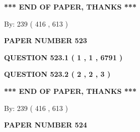 \documentclass[12pt]{article}
\begin{document}
  
   
   
 \vspace{0.2in}
 
   
   
   
   
\vspace{1.0in} 
{\textbf{\large{ *** END OF PAPER, THANKS *** }}} 
   
   
\hspace{1.0in} By: 
 239 ( 416 ,  613 )
   
   
   
   
\newpage 
\setcounter{page}{ 
   523001 } 
   
   
   
   
 {\textbf{ \Large{ PAPER NUMBER  523  }}}
   
   
\vspace{0.2in}
   
   
   
   
   
   
 \vspace{0.2in}
 
 
 
 
   
   
  
\vspace{0.2in}
  
{\textbf{\Large{QUESTION
523.1 
 ( 1 , 1 , 6791 )
}}}
  
  
  
\vspace{0.2in}
  
{\textbf{\Large{QUESTION
523.2 
 ( 2 , 2 , 3 )
}}}
  
  
   
   
 \vspace{0.2in}
 
   
   
   
   
\vspace{1.0in} 
{\textbf{\large{ *** END OF PAPER, THANKS *** }}} 
   
   
\hspace{1.0in} By: 
 239 ( 416 ,  613 )
   
   
   
   
\newpage 
\setcounter{page}{ 
   524001 } 
   
   
   
   
 {\textbf{ \Large{ PAPER NUMBER  524  }}}
   
\end{document}
